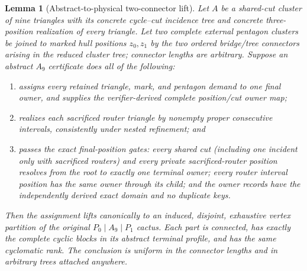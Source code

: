 \documentclass[11pt]{article}
\newtheorem{lemma}[theorem]{Lemma}
\theoremstyle{remark}
\begin{document}
\begin{lemma}[Abstract-to-physical two-connector lift]\label{lem:a9lift}
Let $A$ be a shared-cut cluster of nine triangles with its concrete
cycle--cut incidence tree and concrete three-position realization of every
triangle.  Let two complete external pentagon clusters be joined to marked hull
positions $z_0,z_1$ by the two ordered bridge/tree connectors arising in the
reduced cluster tree; connector lengths are arbitrary.  Suppose an abstract
$A_9$ certificate does all of the following:
\begin{enumerate}
 \item assigns every retained triangle, mark, and pentagon demand to one final
 owner, and supplies the verifier-derived complete position/cut owner map;
 \item realizes each sacrificed router triangle by nonempty proper consecutive
 intervals, consistently under nested refinement; and
 \item passes the exact final-position gates: every shared cut (including one
 incident only with sacrificed routers) and every private sacrificed-router
 position resolves from the root to exactly one terminal owner; every router
 interval position has the same owner through its child; and the owner records
 have the independently derived exact domain and no duplicate keys.
\end{enumerate}
Then the assignment lifts canonically to an induced, disjoint, exhaustive
vertex partition of the original $P_0\mid A_9\mid P_1$ cactus.  Each part is
connected, has exactly the complete cyclic blocks in its abstract terminal
profile, and has the same cyclomatic rank.  The conclusion is uniform in the
connector lengths and in arbitrary trees attached anywhere.
\end{lemma}
\end{document}
